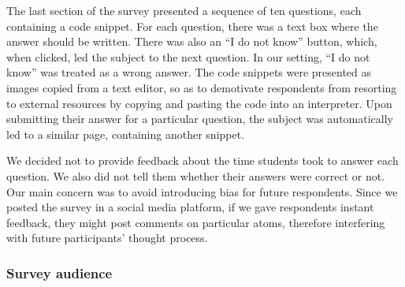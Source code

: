 The last section of the survey presented a sequence of ten questions, each containing a code snippet. For each question, there was a text box where the answer should be written. There was also an ``I do not know'' button, which, when clicked, led the subject to the next question. In our setting, ``I do not know'' was treated as a wrong answer. The code snippets were presented as images copied from a text editor, so as to demotivate respondents from resorting to external resources by copying and pasting the code into an interpreter. Upon submitting their answer for a particular question, the subject was automatically led to a similar page, containing another snippet.

We decided not to provide feedback about the time students took to answer each question. We also did not tell them whether their answers were correct or not. Our main concern was to avoid introducing bias for future respondents. Since we posted the survey in a social media platform, if we gave respondents instant feedback, they might post comments on particular atoms, therefore interfering with future participants' thought process.



\subsubsection*{Survey audience}


